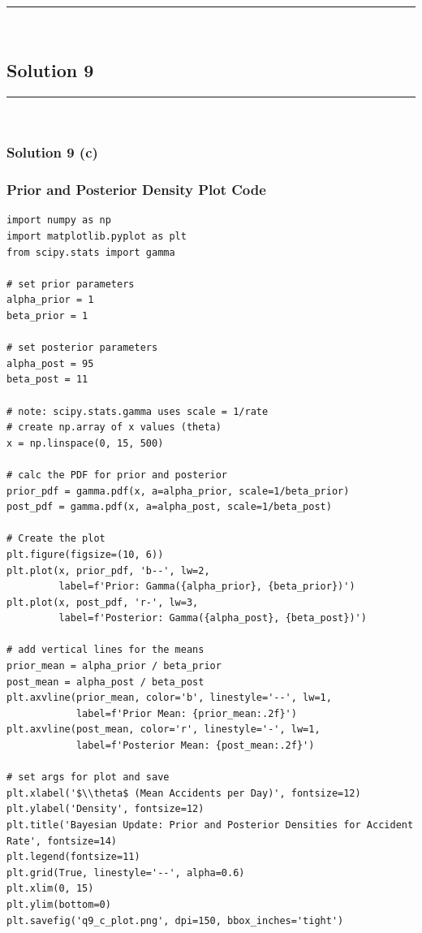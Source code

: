 \documentclass{article}
\begin{document}
\noindent\rule{\textwidth}{0.4pt}\\

\newpage

\subsection*{Solution 9}
\noindent\rule{\textwidth}{0.4pt}\\
\subsubsection*{Solution 9 (c)}
\subsubsection*{Prior and Posterior Density Plot Code}
\begin{lstlisting}
import numpy as np
import matplotlib.pyplot as plt
from scipy.stats import gamma

# set prior parameters
alpha_prior = 1
beta_prior = 1  

# set posterior parameters
alpha_post = 95
beta_post = 11  

# note: scipy.stats.gamma uses scale = 1/rate
# create np.array of x values (theta)
x = np.linspace(0, 15, 500)

# calc the PDF for prior and posterior
prior_pdf = gamma.pdf(x, a=alpha_prior, scale=1/beta_prior)
post_pdf = gamma.pdf(x, a=alpha_post, scale=1/beta_post)

# Create the plot
plt.figure(figsize=(10, 6))
plt.plot(x, prior_pdf, 'b--', lw=2, 
         label=f'Prior: Gamma({alpha_prior}, {beta_prior})')
plt.plot(x, post_pdf, 'r-', lw=3, 
         label=f'Posterior: Gamma({alpha_post}, {beta_post})')

# add vertical lines for the means
prior_mean = alpha_prior / beta_prior
post_mean = alpha_post / beta_post
plt.axvline(prior_mean, color='b', linestyle='--', lw=1, 
            label=f'Prior Mean: {prior_mean:.2f}')
plt.axvline(post_mean, color='r', linestyle='-', lw=1, 
            label=f'Posterior Mean: {post_mean:.2f}')

# set args for plot and save
plt.xlabel('$\\theta$ (Mean Accidents per Day)', fontsize=12)
plt.ylabel('Density', fontsize=12)
plt.title('Bayesian Update: Prior and Posterior Densities for Accident Rate', fontsize=14)
plt.legend(fontsize=11)
plt.grid(True, linestyle='--', alpha=0.6)
plt.xlim(0, 15)
plt.ylim(bottom=0)
plt.savefig('q9_c_plot.png', dpi=150, bbox_inches='tight')
\end{lstlisting}
\end{document}
